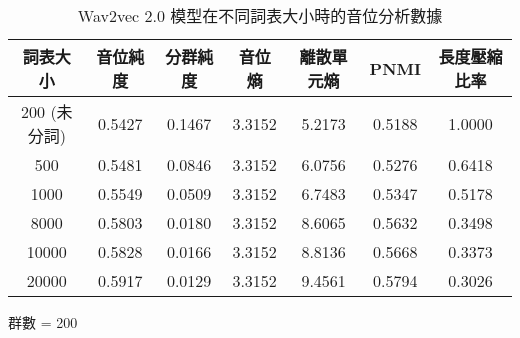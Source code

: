 \begin{table}[!htbp]
    \jefftablesep        

    \begin{subtable}[t]{\textwidth}
        \centering
        \begin{tabular}{|c|c|c|c|c|c|c|} \hline 
                詞表大小  & 音位純度 & 分群純度 & 音位熵 & 離散單元熵 &    PNMI & 長度壓縮比率 \\ \hline 
 200 (未分詞)&  0.5427 &   0.1467 & 3.3152 &     5.2173 & 0.5188 &1.0000\\ \hline 
                  500  &   0.5481&     0.0846    &3.3152 &   6.0756  &       0.5276 &0.6418 \\ \hline %
                 1000  &   0.5549&     0.0509    &3.3152 &   6.7483  &       0.5347 &0.5178 \\ \hline %
                 8000  &   0.5803&     0.0180    &3.3152 &   8.6065  &       0.5632 &0.3498 \\ \hline %
                10000  &   0.5828&     0.0166    &3.3152 &   8.8136  &       0.5668 &0.3373 \\ \hline %
                20000  &   0.5917&     0.0129    &3.3152 &   9.4561  &       0.5794 &0.3026  \\ \hline %
        \end{tabular}
\caption{群數 = 200}
        \label{tab:ch4-w2v2-phn-clu200}
    \end{subtable}        

\caption{Wav2vec 2.0 模型在不同詞表大小時的音位分析數據}
    \label{tab:w2v2-phn-results}
\end{table}



